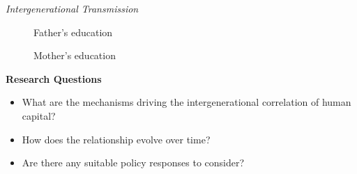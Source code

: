 \begin{frame}\begin{center}
\LARGE\textit{Intergenerational Transmission}
\end{center}\end{frame}
\begin{frame}\begin{figure}[htp]\centering
\caption{Father's education}
\end{figure}\end{frame}
\begin{frame}\begin{figure}[htp]\centering
\caption{Mother's education}
\end{figure}\end{frame}
\begin{frame}\textbf{Research Questions}\vspace{0.3cm}
\begin{itemize}\setlength\itemsep{1em}
\item What are the mechanisms driving the intergenerational correlation of human capital?
\item How does the relationship evolve over time?
\item Are there any suitable policy responses to consider?
\end{itemize}
\end{frame}
